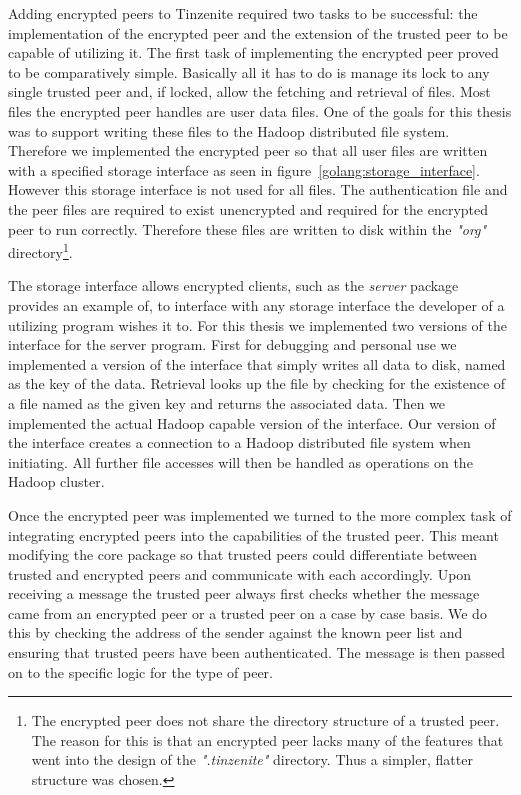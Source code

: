 Adding encrypted peers to Tinzenite required two tasks to be successful: the implementation of the encrypted peer and the extension of the trusted peer to be capable of utilizing it.
The first task of implementing the encrypted peer proved to be comparatively simple.
Basically all it has to do is manage its lock to any single trusted peer and, if locked, allow the fetching and retrieval of files.
Most files the encrypted peer handles are user data files.
One of the goals for this thesis was to support writing these files to the Hadoop distributed file system.
Therefore we implemented the encrypted peer so that all user files are written with a specified storage interface as seen in figure~\ref{golang:storage_interface}.
However this storage interface is not used for all files.
The authentication file and the peer files are required to exist unencrypted and required for the encrypted peer to run correctly.
Therefore these files are written to disk within the \textit{"org"} directory\footnote{The encrypted peer does not share the directory structure of a trusted peer. The reason for this is that an encrypted peer lacks many of the features that went into the design of the \textit{".tinzenite"} directory. Thus a simpler, flatter structure was chosen.}.

The storage interface allows encrypted clients, such as the \emph{server} package provides an example of, to interface with any storage interface the developer of a utilizing program wishes it to.
For this thesis we implemented two versions of the interface for the server program.
First for debugging and personal use we implemented a version of the interface that simply writes all data to disk, named as the key of the data.
Retrieval looks up the file by checking for the existence of a file named as the given key and returns the associated data.
Then we implemented the actual Hadoop capable version of the interface.
Our version of the interface creates a connection to a Hadoop distributed file system when initiating.
All further file accesses will then be handled as operations on the Hadoop cluster.

Once the encrypted peer was implemented we turned to the more complex task of integrating encrypted peers into the capabilities of the trusted peer.
This meant modifying the core package so that trusted peers could differentiate between trusted and encrypted peers and communicate with each accordingly.
Upon receiving a message the trusted peer always first checks whether the message came from an encrypted peer or a trusted peer on a case by case basis.
We do this by checking the address of the sender against the known peer list and ensuring that trusted peers have been authenticated.
The message is then passed on to the specific logic for the type of peer.

